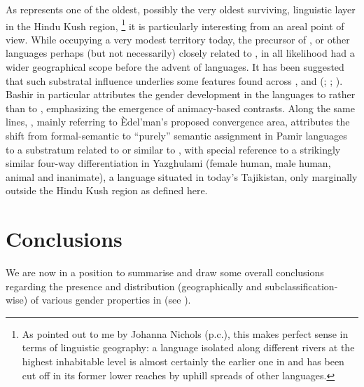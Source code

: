 \documentclass[output=collectionpaper]{langsci/langscibook}
\begin{document}
As  represents one of the oldest, possibly the very oldest surviving, linguistic layer in the Hindu Kush region,%
\footnote{%
As pointed out to me by Johanna Nichols (p.c.), this makes perfect sense in terms of linguistic geography: a language isolated along different rivers at the highest inhabitable level is almost certainly the earlier one in and has been cut off in its former lower reaches by uphill spreads of other languages.}  it is particularly interesting from an areal point of view. While occupying a very modest territory today, the precursor of , or other languages perhaps (but not necessarily) closely related to , in all likelihood had a wider geographical scope before the advent of  languages. It has been suggested that such substratal influence underlies some features found across ,  and  (\citealt{Tikkanen1988,Tikkanen1999}; \citealt[408--420]{Bashir1988}; \citealt{Edelman1980}). Bashir in particular attributes the gender development in the  languages to  rather than to , emphasizing the emergence of animacy-based contrasts. Along the same lines, \citet[423]{Payne1989}, mainly referring to Èdel'man's proposed convergence area, attributes the shift from formal-semantic to ``purely'' semantic assignment in  Pamir languages to a substratum related to or similar to , with special reference to a strikingly similar four-way differentiation in  Yazghulami (female human, male human, animal and inanimate), a language situated in today's Tajikistan, only marginally outside the Hindu Kush region as defined here.

\section{Conclusions}

We are now in a position to summarise and draw some overall conclusions regarding the presence and distribution (geographically and subclassification-wise) of various gender properties in  (see ).
\end{document}
